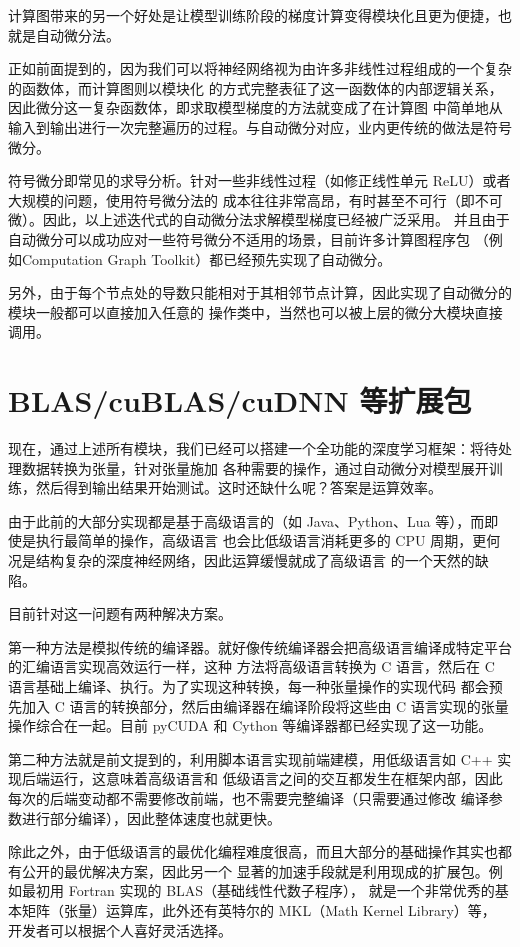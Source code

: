 计算图带来的另一个好处是让模型训练阶段的梯度计算变得模块化且更为便捷，也就是自动微分法。

正如前面提到的，因为我们可以将神经网络视为由许多非线性过程组成的一个复杂的函数体，而计算图则以模块化
的方式完整表征了这一函数体的内部逻辑关系，因此微分这一复杂函数体，即求取模型梯度的方法就变成了在计算图
中简单地从输入到输出进行一次完整遍历的过程。与自动微分对应，业内更传统的做法是符号微分。

符号微分即常见的求导分析。针对一些非线性过程（如修正线性单元 ReLU）或者大规模的问题，使用符号微分法的
成本往往非常高昂，有时甚至不可行（即不可微）。因此，以上述迭代式的自动微分法求解模型梯度已经被广泛采用。
并且由于自动微分可以成功应对一些符号微分不适用的场景，目前许多计算图程序包
（例如Computation Graph Toolkit）都已经预先实现了自动微分。

另外，由于每个节点处的导数只能相对于其相邻节点计算，因此实现了自动微分的模块一般都可以直接加入任意的
操作类中，当然也可以被上层的微分大模块直接调用。


\section{BLAS/cuBLAS/cuDNN 等扩展包}\label{sec:blas-extension}

现在，通过上述所有模块，我们已经可以搭建一个全功能的深度学习框架：将待处理数据转换为张量，针对张量施加
各种需要的操作，通过自动微分对模型展开训练，然后得到输出结果开始测试。这时还缺什么呢？答案是运算效率。

由于此前的大部分实现都是基于高级语言的（如 Java、Python、Lua 等），而即使是执行最简单的操作，高级语言
也会比低级语言消耗更多的 CPU 周期，更何况是结构复杂的深度神经网络，因此运算缓慢就成了高级语言
的一个天然的缺陷。

目前针对这一问题有两种解决方案。

第一种方法是模拟传统的编译器。就好像传统编译器会把高级语言编译成特定平台的汇编语言实现高效运行一样，这种
方法将高级语言转换为 C 语言，然后在 C 语言基础上编译、执行。为了实现这种转换，每一种张量操作的实现代码
都会预先加入 C 语言的转换部分，然后由编译器在编译阶段将这些由 C 语言实现的张量操作综合在一起。目前
pyCUDA 和 Cython 等编译器都已经实现了这一功能。

第二种方法就是前文提到的，利用脚本语言实现前端建模，用低级语言如 C++ 实现后端运行，这意味着高级语言和
低级语言之间的交互都发生在框架内部，因此每次的后端变动都不需要修改前端，也不需要完整编译（只需要通过修改
编译参数进行部分编译），因此整体速度也就更快。

除此之外，由于低级语言的最优化编程难度很高，而且大部分的基础操作其实也都有公开的最优解决方案，因此另一个
显著的加速手段就是利用现成的扩展包。例如最初用 Fortran 实现的 BLAS（基础线性代数子程序），
就是一个非常优秀的基本矩阵（张量）运算库，此外还有英特尔的 MKL（Math Kernel Library）等，
开发者可以根据个人喜好灵活选择。

